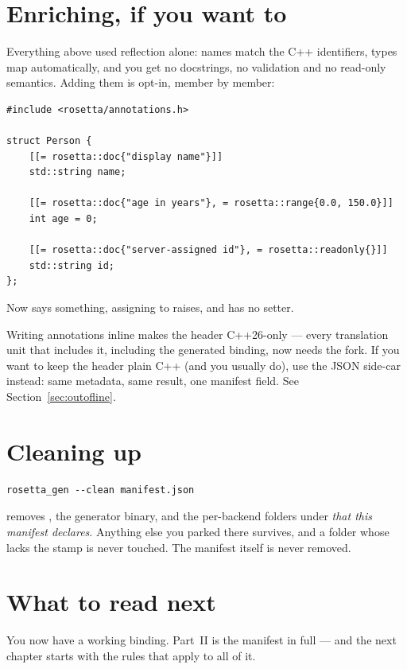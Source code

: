 \section{Enriching, if you want to}

Everything above used reflection alone: names match the C++ identifiers, types
map automatically, and you get no docstrings, no validation and no read-only
semantics. Adding them is opt-in, member by member:

\begin{lstlisting}[style=cpp]
#include <rosetta/annotations.h>

struct Person {
    [[= rosetta::doc{"display name"}]]
    std::string name;

    [[= rosetta::doc{"age in years"}, = rosetta::range{0.0, 150.0}]]
    int age = 0;

    [[= rosetta::doc{"server-assigned id"}, = rosetta::readonly{}]]
    std::string id;
};
\end{lstlisting}

Now  says something, assigning  to
 raises, and  has no setter.

\begin{warn}
Writing annotations inline makes the header C++26-only --- every translation
unit that includes it, including the generated binding, now needs the fork.
If you want to keep the header plain C++ (and you usually do), use the JSON
side-car instead: same metadata, same result, one manifest field.
See Section~\ref{sec:outofline}.
\end{warn}

\section{Cleaning up}

\begin{lstlisting}[style=sh]
rosetta_gen --clean manifest.json
\end{lstlisting}

removes , the generator binary, and the per-backend folders under
 \emph{that this manifest declares}. Anything else you parked
there survives, and a folder whose  lacks the
 stamp is never touched. The manifest itself is
never removed.

\section{What to read next}

You now have a working binding. Part~II is the manifest in full --- and the
next chapter starts with the rules that apply to all of it.
